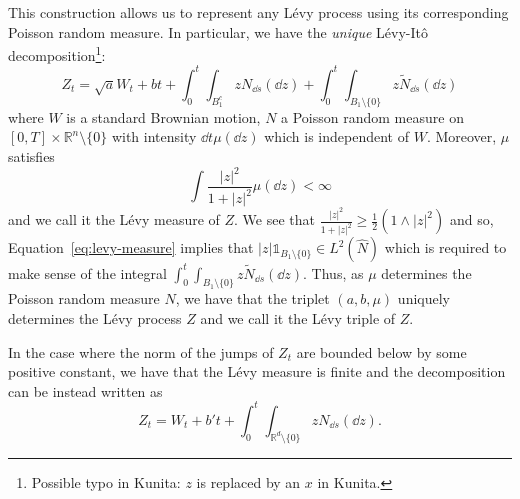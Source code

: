 \documentclass[]{article}
\theoremstyle{definition}
\theoremstyle{definition}
\begin{document}
This construction allows us to represent any L\'evy process using its corresponding Poisson random measure. 
In particular, we have the \textit{unique} L\'evy-It\^o decomposition\footnote{Possible typo in Kunita: \(z\) is 
replaced by an \(x\) in Kunita.}:
\[Z_t = \sqrt{a}W_t + bt + \int_0^t \int_{B_1^c} z N_{\dd s}(\dd z) 
  + \int_0^t\int_{B_1 \setminus \{0\}} z \tilde N_{\dd s}(\dd z)\]
where \(W\) is a standard Brownian motion, \(N\) a Poisson random measure on \([0, T] \times \mathbb{R}^n \setminus \{0\}\) 
with intensity \(\dd t\mu(\dd z)\) which is independent of \(W\). Moreover, \(\mu\) satisfies 
\begin{equation}\label{eq:levy-measure}
  \int \frac{|z|^2}{1 + |z|^2} \mu(\dd z) < \infty
\end{equation}
and we call it the L\'evy measure of \(Z\). We see that \(\frac{|z|^2}{1 + |z|^2} \ge \frac{1}{2}(1 \wedge |z|^2)\) 
and so, Equation~\eqref{eq:levy-measure} implies that \(|z|\mathbb{1}_{B_1\setminus\{0\}} \in L^2(\hat N)\) which is 
required to make sense of the integral \(\int_0^t \int_{B_1 \setminus \{0\}} z \tilde N_{\dd s}(\dd z)\).
Thus, as \(\mu\) determines the Poisson random measure \(N\), 
we have that the triplet \((a, b, \mu)\) uniquely determines the L\'evy process \(Z\) and we call it the 
L\'evy triple of \(Z\).

In the case where the norm of the jumps of \(Z_t\) are bounded below by some positive constant, we have that the 
L\'evy measure is finite and the decomposition can be instead written as 
\[Z_t = W_t + b't + \int_0^t \int_{\mathbb{R}^d \setminus \{0\}} z N_{\dd s}(\dd z).\]
\end{document}
